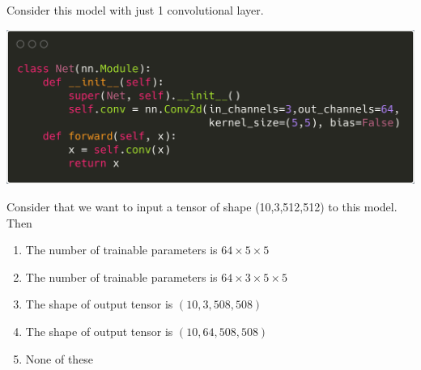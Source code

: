 \begin{frame}
\section{}
Consider this model with just 1 convolutional layer.

\includegraphics[scale=0.1]{images/q33_5.png}

Consider that we want to input a tensor of shape (10,3,512,512) to this model. Then

\begin{enumerate}[label=(\Alph*)]
\item The number of trainable parameters is $64\times5\times5$
\item The number of trainable parameters is $64\times3\times5\times5$   %
\item The shape of output tensor is $(10,3,508,508)$
\item The shape of output tensor is $(10,64,508,508)$   %
\item None of these   %
\end{enumerate}
\end{frame}
